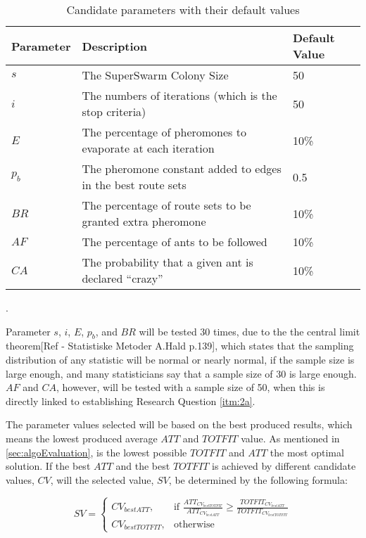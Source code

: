 \begin{table}[H]
	\small
	\begin{tabular}{|l|l|l|}
    	\hline
    	Parameter & Description & Default Value\\
    	\hline
    	$s$ & The SuperSwarm Colony Size & 50\\
    	$i$ & The numbers of iterations (which is the stop criteria) & 50\\
    	$E$ & The percentage of pheromones to evaporate at each iteration & 10\%\\
    	$p_b$ & The pheromone constant added to edges in the best route sets & 0.5\\
    	$BR$ & The percentage of route sets to be granted extra pheromone & 10\%\\
    	$AF$ & The percentage of ants to be followed & 10\%\\
    	$CA$ & The probability that a given ant is declared ``crazy'' & 10\%\\
   	    \hline
    \end{tabular}
    \caption {Candidate parameters with their default values}.
    \label{table:parameters}
\end{table}

Parameter $s$, $i$, $E$, $p_b$, and $BR$  will be tested 30 times, due to the the central limit theorem[Ref - Statistiske Metoder A.Hald p.139], which states that the sampling distribution of any statistic will be normal or nearly normal, if the sample size is large enough, and many statisticians say that a sample size of 30 is large enough. $AF$ and $CA$, however, will be tested with a sample size of 50, when this is directly linked to establishing Research Question \vref{itm:2a}.

The parameter values selected will be based on the best produced results, which means the lowest produced average $ATT$ and $TOTFIT$ value. As mentioned in \vref{sec:algoEvaluation}, is the lowest possible $TOTFIT$ and $ATT$ the most optimal solution. If the best $ATT$ and the best $TOTFIT$ is achieved by different candidate values, $CV$, will the selected value, $SV$, be determined by the following formula:

\[
    SV= 
\begin{cases}
    CV_{bestATT},& \text{if } \frac{ATT_{CV_{bestTOTFIT}}}{ATT_{CV_{bestATT}}}\geq \frac{TOTFIT_{CV_{bestATT}}}{TOTFIT_{CV_{bestTOTFIT}}}\\
    CV_{bestTOTFIT},& \text{otherwise}
\end{cases}
\]


